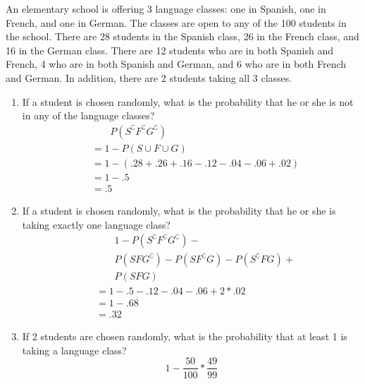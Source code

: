 \item An elementary school is offering 3 language classes: one in Spanish, one in French, and one in German. The classes are open to any of the 100 students in the school. There are 28 students in the Spanish class, 26 in the French class, and 16 in the German class. There are 12 students who are in both Spanish and French, 4 who are in both Spanish and German, and 6 who are in both French and German. In addition, there are 2 students taking all 3 classes.
\begin{enumerate}
    \item If a student is chosen randomly, what is the probability that he or she is not in any of the language classes?
    \begin{align*}
        &\phantom{\;=\;} P(S^\complement F^\complement G^\complement )\\
        &= 1 - P(S\cup F \cup G)\\
        &= 
        1 - ( .28 + .26 + .16 - .12 - .04 - .06 + .02 )\\
        &= 1 - .5\\
        &= .5
    \end{align*}
    \item If a student is chosen randomly, what is the probability that he or she is taking exactly one language class?
    \begin{align*}
        &{\phantom{\; = \;}}1 - P(S^\complement F^\complement G^\complement ) - {}\\
        &\phantom{\;=\;} P(SFG^\complement ) - P(SF^\complement G) - P(S^\complement FG) + {}\\
        &\phantom{\;=\;} P(SFG) \\
        &=1 - .5 - .12 - .04 - .06 + 2 * .02\\
        &=1 - .68\\
        &= .32
    \end{align*}
    \item If 2 students are chosen randomly, what is the probability that at least 1 is taking a language class?
    \[ 1 - \frac{50}{100} * \frac{49}{99} \]
\end{enumerate}